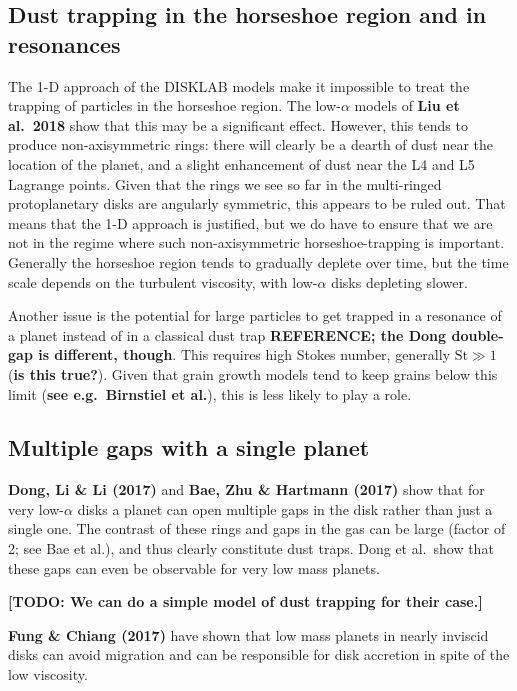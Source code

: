 \documentclass{aa}
\begin{document}
\subsection{Dust trapping in the horseshoe region and in resonances}
The 1-D approach of the {\sf DISKLAB} models make it impossible to treat the
trapping of particles in the horseshoe region. The low-$\alpha$ models of {\bf
  Liu et al.~2018} show that this may be a significant effect. However, this
tends to produce non-axisymmetric rings: there will clearly be a dearth of dust
near the location of the planet, and a slight enhancement of dust near the L4
and L5 Lagrange points. Given that the rings we see so far in the multi-ringed
protoplanetary disks are angularly symmetric, this appears to be ruled out.
That means that the 1-D approach is justified, but we do have to ensure that we
are not in the regime where such non-axisymmetric horseshoe-trapping is
important. Generally the horseshoe region tends to gradually deplete over time,
but the time scale depends on the turbulent viscosity, with low-$\alpha$ disks
depleting slower. 

Another issue is the potential for large particles to get trapped in a
resonance of a planet instead of in a classical dust trap {\bf REFERENCE;
the Dong double-gap is different, though}.
This requires high Stokes number, generally $\mathrm{St}\gg 1$ ({\bf is
  this true?}). Given that grain growth models tend to keep grains below
this limit ({\bf see e.g.~Birnstiel et al.}), this is less likely to play
a role.

\subsection{Multiple gaps with a single planet}
{\bf Dong, Li \& Li (2017)} and 
{\bf Bae, Zhu \& Hartmann (2017)} show that for very low-$\alpha$ disks
a planet can open multiple gaps in the disk rather than just a single one.
The contrast of these rings and gaps in the gas can be large (factor of 2; see
Bae et al.),
and thus clearly constitute dust traps. Dong et al.\ show that these gaps
can even be observable for very low mass planets.

{\bf [TODO: We can do a simple model of dust trapping for their case.]}

{\bf Fung \& Chiang (2017)} have shown that low mass planets in nearly inviscid
disks can avoid migration and can be responsible for disk accretion in spite
of the low viscosity.
\end{document}
